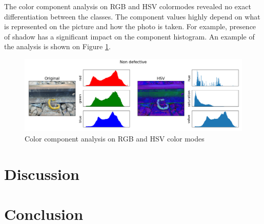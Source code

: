 \documentclass[10pt, final]{article}
\begin{document}
			The color component analysis on RGB and HSV colormodes revealed no exact differentiation between the classes.
			The component values highly depend on what is represented on the picture and how the photo is taken.
			For example, presence of shadow has a significant impact on the component histogram.
			An example of the analysis is shown on Figure \ref{fig:color_analysis}.
			\begin{figure}[!ht]
				\centering
				\includegraphics[width=\textwidth]{./plots/comp_analysis_1.png}
				\caption{Color component analysis on RGB and HSV color modes}
				\label{fig:color_analysis}
			\end{figure}
	\section{Discussion} \label{sec:discussion}
	\section{Conclusion} \label{sec:conclusion}
	\listoffigures
	\listoftables
	\printbibliography
\end{document}
